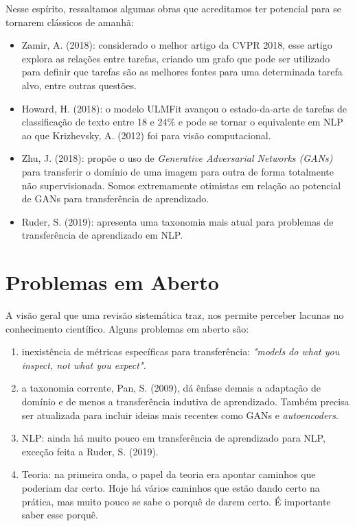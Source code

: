 \documentclass[sigconf]{acmart}
\begin{document}
  Nesse espírito, ressaltamos algumas obras que acreditamos ter potencial para se tornarem clássicos de amanhã:
  \begin{itemize}
    \item Zamir, A. (2018)\cite{taskonomy}: considerado o melhor artigo da CVPR 2018, esse artigo explora as relações entre tarefas, criando um grafo que pode ser utilizado para definir que tarefas são as melhores fontes para uma determinada tarefa alvo, entre outras questões.
    \item Howard, H. (2018)\cite{ulmfit}: o modelo ULMFit avançou o estado-da-arte de tarefas de classificação de texto entre 18 e 24\% e pode se tornar o equivalente em NLP ao que Krizhevsky, A. (2012)\cite{alexnet} foi para visão computacional. 
    \item Zhu, J. (2018)\cite{CycleGan}: propõe o uso de \emph{Generative Adversarial Networks (GANs)} para transferir o domínio de uma imagem para outra de forma totalmente não supervisionada.  Somos extremamente otimistas em relação ao potencial de GANs para transferência de aprendizado.
    \item Ruder, S. (2019)\cite{Ruder2019Neural}: apresenta uma taxonomia mais atual para problemas de transferência de aprendizado em NLP.
  \end{itemize}

\section{Problemas em Aberto}\label{emAberto}
A visão geral que uma revisão sistemática traz, nos permite perceber lacunas no conhecimento científico. Alguns problemas em aberto são:
\begin{enumerate}
  \item inexistência de métricas específicas para transferência: \emph{"models do what you inspect, not what you expect".}
  \item a taxonomia corrente, Pan, S. (2009)\cite{PanYang}, dá ênfase demais a adaptação de domínio e de menos a transferência indutiva de aprendizado. Também precisa ser atualizada para incluir ideias mais recentes como GANs e \emph{autoencoders}. 
  \item NLP: ainda há muito pouco em transferência de aprendizado para NLP, exceção feita a Ruder, S. (2019)\cite{Ruder2019Neural}.
  \item Teoria: na primeira onda, o papel da teoria era apontar caminhos que poderiam dar certo. Hoje há vários caminhos que estão dando certo na prática, mas muito pouco se sabe  o porquê de darem certo. É importante saber esse porquê. 
\end{enumerate}
\end{document}
